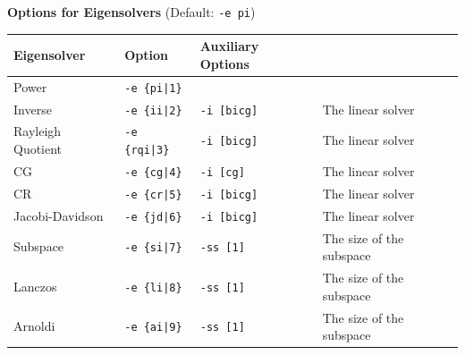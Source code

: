 \documentclass[a4paper]{article}
\begin{document}
\begin{minipage}[t]{\textwidth}
\begin{center}
{\bf Options for Eigensolvers} (Default: \verb=-e pi=) \\
\begin{tabular}{l|lll}\hline\hline
 Eigensolver      & Option              &  Auxiliary Options  & \\ \hline
\hline
 Power                             & \verb=-e {pi|1}=        &    \\ 
 Inverse                           & \verb=-e {ii|2}=        &
 \verb=-i [bicg]= & The linear solver \\
 Rayleigh Quotient                 & \verb=-e {rqi|3}=       &
 \verb=-i [bicg]= & The linear solver \\
 CG                                & \verb=-e {cg|4}=        &
 \verb=-i [cg]= & The linear solver \\ 
 CR                                & \verb=-e {cr|5}=        &
 \verb=-i [bicg]= & The linear solver \\ 
 Jacobi-Davidson                   & \verb=-e {jd|6}=        &
 \verb=-i [bicg]= & The linear solver \\ 
 Subspace                          & \verb=-e {si|7}=        &
 \verb=-ss [1]= & The size of the subspace \\
 Lanczos                           & \verb=-e {li|8}=        &
 \verb=-ss [1]= & The size of the subspace \\
 Arnoldi                           & \verb=-e {ai|9}=        &
 \verb=-ss [1]= & The size of the subspace \\
\hline         
\end{tabular}
\end{center}
\end{minipage}
\\ \\
\end{document}
